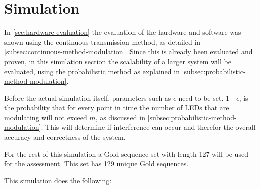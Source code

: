 
\section{Simulation}
\label{sec:simulation-evaluation}

In \autoref{sec:hardware-evaluation} the evaluation of the hardware and software was shown using the continuous transmission method, as detailed in \autoref{subsec:continuous-method-modulation}.
Since this is already been evaluated and proven, in this simulation section the scalability of a larger system will be evaluated, using the probabilistic method as explained in \autoref{subsec:probabilistic-method-modulation}.


Before the actual simulation itself, parameters such as $\epsilon$ need to be set.
1 - $\epsilon$, is the probability that for every point in time the number of LEDs that are modulating will not exceed $m$, as discussed in \autoref{subsec:probabilistic-method-modulation}.
This will determine if interference can occur and therefor the overall accuracy and correctness of the system.

For the rest of this simulation a Gold sequence set with length 127 will be used for the assessment.
This set has 129 unique Gold sequences.

This simulation does the following: 

